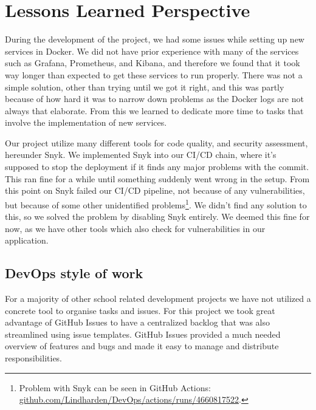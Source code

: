 \section{Lessons Learned Perspective} \label{sec:lessons}

During the development of the project, we had some issues while setting up new services in Docker. We did not have prior experience with many of the services such as Grafana, Prometheus, and Kibana, and therefore we found that it took way longer than expected to get these services to run properly. There was not a simple solution, other than trying until we got it right, and this was partly because of how hard it was to narrow down problems as the Docker logs are not always that elaborate. From this we learned to dedicate more time to tasks that involve the implementation of new services.

Our project utilize many different tools for code quality, and security assessment, hereunder Snyk. We implemented Snyk into our CI/CD chain, where it's supposed to stop the deployment if it finds any major problems with the commit. This ran fine for a while until something suddenly went wrong in the setup. From this point on Snyk failed our CI/CD pipeline, not because of any vulnerabilities, but because of some other unidentified problems\footnote{Problem with Snyk can be seen in GitHub Actions: \href{https://github.com/Lindharden/DevOps/actions/runs/4660817522/jobs/8261515084?pr=98}{github.com/Lindharden/DevOps/actions/runs/4660817522}.}. We didn't find any solution to this, so we solved the problem by disabling Snyk entirely. We deemed this fine for now, as we have other tools which also check for vulnerabilities in our application.

\subsection{DevOps style of work}
For a majority of other school related development projects we have not utilized a concrete tool to organise tasks and issues. For this project we took great advantage of GitHub Issues to have a centralized backlog that was also streamlined using issue templates. GitHub Issues provided a much needed overview of features and bugs and made it easy to manage and distribute responsibilities.

